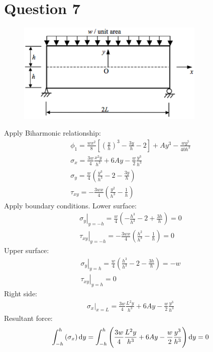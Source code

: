 \section{Question 7}
\begin{figure}[H]
    \centering
    \includegraphics[width = 0.8\textwidth]{./img/diagram2.png}
    \caption{}
\end{figure}
Apply Biharmonic relationship:
\begin{gather}
    \phi_1 = \frac{wx^2}{8} \left[\left(\frac{y}{h}\right)^3-\frac{3y}{h} -2 \right] + Ay^3 - \frac{wy^5}{40h^3}\\
    \sigma_x = \frac{3w}{4}\frac{x^2y}{h^3} + 6Ay - \frac{w}{2}\frac{y^3}{h^3}\\
    \sigma_y = \frac{w}{4}\left(\frac{y^3}{h^3}-2-\frac{3y}{h}\right)\\
    \tau_{xy} = -\frac{3wx}{4}\left(\frac{y^2}{h^3} - \frac{1}{h}\right)
\end{gather}
Apply boundary conditions. Lower surface:
\begin{gather}
    \left. \sigma_y \right|_{y=-h} = \frac{w}{4}\left(-\frac{h^3}{h^3}-2 + \frac{3h}{h}\right) = 0\\
    \left. \tau_{xy}\right|_{y=-h} = -\frac{3wx}{4}\left(\frac{h^2}{h^3}-\frac{1}{h}\right) = 0
\end{gather}
Upper surface:
\begin{gather}
    \left. \sigma_y \right|_{y=h} = \frac{w}{4}\left(\frac{h^3}{h^3} - 2 - \frac{3h}{h}\right) = -w\\
    \left. \tau_{xy}\right|_{y=h} = 0
\end{gather}
Right side:
\begin{gather}
    \left. \sigma_x \right|_{x = L} = \frac{3w}{4}\frac{L^2y}{h^3} + 6Ay -\frac{w}{2}\frac{y^3}{h^3}
\end{gather}
Resultant force:
\begin{gather}
    \int_{-h}^h \left(\sigma_x\right)\dif y = \int_{-h}^h \left(\frac{3w}{4}\frac{L^2y}{h^3} + 6Ay -\frac{w}{2}\frac{y^3}{h^3}\right)\dif y = 0
\end{gather}
